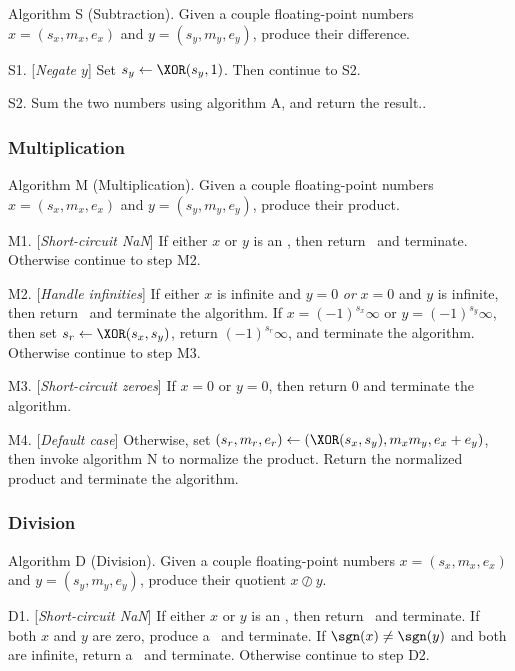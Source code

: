 \algbegin Algorithm S (Subtraction). \label{alg:float-subtraction}Given a couple floating-point
numbers $x=(s_{x},m_{x},e_{x})$ and $y=(s_{y}, m_{y}, e_{y})$, produce
their difference.

\algstep S1. [{\it Negate $y$\/}] Set $s_{y}\gets\XOR(s_{y},1)$. Then
continue to S2.

\algstep S2. Sum the two numbers using algorithm A, and return the result.\quad\slug.

\subsubsection{Multiplication} 


\algbegin Algorithm M (Multiplication). \label{alg:float-multiplication}Given a couple floating-point
numbers $x=(s_{x},m_{x},e_{x})$ and $y=(s_{y}, m_{y}, e_{y})$, produce
their product.

\algstep M1. [{\it Short-circuit NaN\/}] If either $x$ or $y$ is an
\NaN, then return \qNaN\ and terminate. Otherwise continue to step M2.

\algstep M2. [{\it Handle infinities\/}] If either $x$ is infinite and
$y=0$ \emph{or} $x=0$ and $y$ is infinite, then return \qNaN\ and
terminate the algorithm.
If $x=(-1)^{s_{x}}\infty$ or $y=(-1)^{s_{y}}\infty$, then set
$s_{r}\gets\XOR(s_{x},s_{y})$, return $(-1)^{s_{r}}\infty$, and
terminate the algorithm.
Otherwise continue to step M3.

\algstep M3. [{\it Short-circuit zeroes\/}] If $x=0$ or $y=0$, then
return 0 and terminate the algorithm.

\algstep M4. [{\it Default case\/}] Otherwise, set
$(s_{r}, m_{r},e_{r})\gets (\XOR(s_{x},s_{y}), m_{x}m_{y}, e_{x}+e_{y})$,
then invoke algorithm N to normalize the product. Return the normalized
product and terminate the algorithm.\quad\slug

\subsubsection{Division}

\algbegin Algorithm D (Division). \label{alg:float-division}Given a couple floating-point
numbers $x=(s_{x},m_{x},e_{x})$ and $y=(s_{y}, m_{y}, e_{y})$, produce
their quotient $x\oslash y$.

\algstep D1. [{\it Short-circuit NaN\/}] If either $x$ or $y$ is an
\NaN, then return \qNaN\ and terminate. If both $x$ and $y$ are zero,
produce a \qNaN\ and terminate. If $\sgn(x)\neq\sgn(y)$ and both are
infinite, return a \qNaN\ and terminate. Otherwise continue to step D2.


